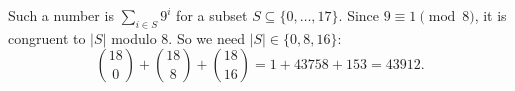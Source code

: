 Such a number is $\sum_{i\in S}9^i$ for a subset $S\subseteq\{0,\dots,17\}$. Since $9\equiv1\pmod 8$, it is congruent to $|S|$ modulo $8$. So we need $|S|\in\{0,8,16\}$:
\[\binom{18}0+\binom{18}8+\binom{18}{16}=1+43758+153=\boxed{43912}.\]
